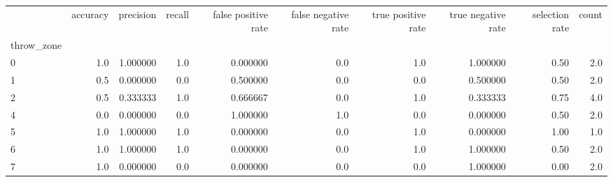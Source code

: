 \begin{tabular}{lrrrrrrrrr}
\toprule
{} &  accuracy &  precision &  recall &  false positive rate &  false negative rate &  true positive rate &  true negative rate &  selection rate &  count \\
throw\_zone &           &            &         &                      &                      &                     &                     &                 &        \\
\midrule
0          &       1.0 &   1.000000 &     1.0 &             0.000000 &                  0.0 &                 1.0 &            1.000000 &            0.50 &    2.0 \\
1          &       0.5 &   0.000000 &     0.0 &             0.500000 &                  0.0 &                 0.0 &            0.500000 &            0.50 &    2.0 \\
2          &       0.5 &   0.333333 &     1.0 &             0.666667 &                  0.0 &                 1.0 &            0.333333 &            0.75 &    4.0 \\
4          &       0.0 &   0.000000 &     0.0 &             1.000000 &                  1.0 &                 0.0 &            0.000000 &            0.50 &    2.0 \\
5          &       1.0 &   1.000000 &     1.0 &             0.000000 &                  0.0 &                 1.0 &            0.000000 &            1.00 &    1.0 \\
6          &       1.0 &   1.000000 &     1.0 &             0.000000 &                  0.0 &                 1.0 &            1.000000 &            0.50 &    2.0 \\
7          &       1.0 &   0.000000 &     0.0 &             0.000000 &                  0.0 &                 0.0 &            1.000000 &            0.00 &    2.0 \\
\bottomrule
\end{tabular}
